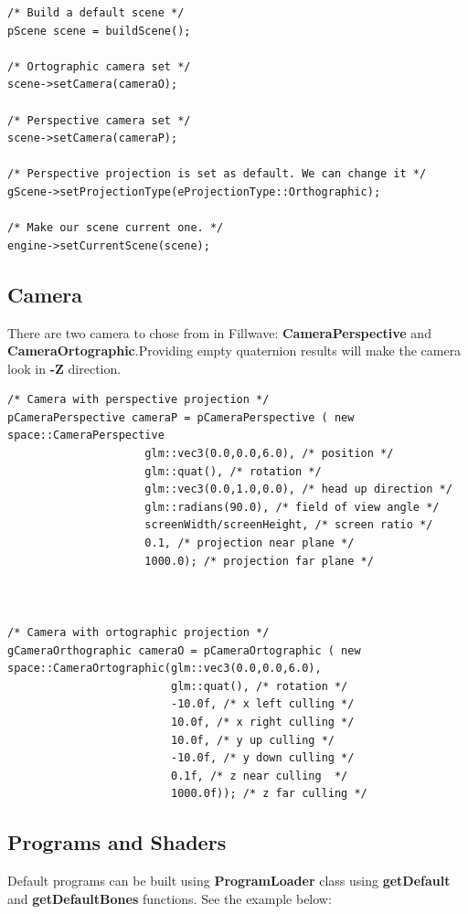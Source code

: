 \documentclass{article}
\begin{document}
\begin{lstlisting}
/* Build a default scene */
pScene scene = buildScene();

/* Ortographic camera set */
scene->setCamera(cameraO);

/* Perspective camera set */
scene->setCamera(cameraP);

/* Perspective projection is set as default. We can change it */
gScene->setProjectionType(eProjectionType::Orthographic);

/* Make our scene current one. */
engine->setCurrentScene(scene);

\end{lstlisting}

\subsection{Camera}\label{sec:Camera}

\indent \indent There are two camera to chose from in Fillwave: \textbf{CameraPerspective} and \textbf{CameraOrtographic}.Providing empty quaternion results will make the camera look in \textbf{-Z} direction.

\begin{lstlisting}
/* Camera with perspective projection */
pCameraPerspective cameraP = pCameraPerspective ( new space::CameraPerspective
                     glm::vec3(0.0,0.0,6.0), /* position */
                     glm::quat(), /* rotation */                
                     glm::vec3(0.0,1.0,0.0), /* head up direction */         
                     glm::radians(90.0), /* field of view angle */        
                     screenWidth/screenHeight, /* screen ratio */
                     0.1, /* projection near plane */
                     1000.0); /* projection far plane */



/* Camera with ortographic projection */
gCameraOrthographic cameraO = pCameraOrtographic ( new space::CameraOrtographic(glm::vec3(0.0,0.0,6.0),
                         glm::quat(), /* rotation */                
                         -10.0f, /* x left culling */
                         10.0f, /* x right culling */
                         10.0f, /* y up culling */
                         -10.0f, /* y down culling */
                         0.1f, /* z near culling  */
                         1000.0f)); /* z far culling */
\end{lstlisting}

\subsection{Programs and Shaders}\label{sec:Programs and Shaders}
\indent \indent Default programs can be built using \textbf{ProgramLoader} class using \textbf{getDefault} and \textbf{getDefaultBones} functions. See the example below:
\end{document}

